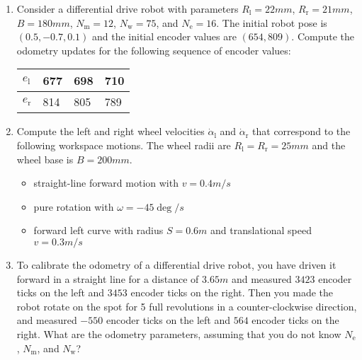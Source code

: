 \documentclass[a4paper]{article}
\begin{document}
\begin{enumerate}

\item
  Consider a differential drive robot with parameters $R_\text{l}=22mm$, $R_\text{r}=21mm$, $B=180mm$, $N_\text{m}=12$, $N_\text{w}=75$, and $N_\text{e}=16$.
  The initial robot pose is $(0.5, -0.7, 0.1)$ and the initial encoder values are $(654, 809)$.
  Compute the odometry updates for the following sequence of encoder values:
  
  \begin{center}
    \begin{tabular}{llll}
      \toprule
      $e_\text{l}$ & 677 & 698 & 710 \\
      \midrule
      $e_\text{r}$ & 814 & 805 & 789 \\
      \bottomrule
    \end{tabular}
  \end{center}
  
\item
  Compute the left and right wheel velocities $\dot{\alpha}_\text{l}$ and $\dot{\alpha}_\text{r}$ that correspond to the following workspace motions.
  The wheel radii are $R_\text{l}=R_\text{r}=25mm$ and the wheel base is $B=200mm$.
  \begin{itemize}
  \item
    straight-line forward motion with $v=0.4m/s$
  \item
    pure rotation with $\omega=-45\deg/s$
  \item
    forward left curve with radius $S=0.6m$ and translational speed $v=0.3m/s$
  \end{itemize}
  
\item
  To calibrate the odometry of a differential drive robot, you have driven it forward in a straight line for a distance of $3.65m$ and measured $3423$ encoder ticks on the left and $3453$ encoder ticks on the right.
  Then you made the robot rotate on the spot for 5 full revolutions in a counter-clockwise direction, and measured $-550$ encoder ticks on the left and $564$ encoder ticks on the right.
  What are the odometry parameters, assuming that you do not know $N_\text{e}$, $N_\text{m}$, and $N_\text{w}$?
  
\end{enumerate}
\end{document}
